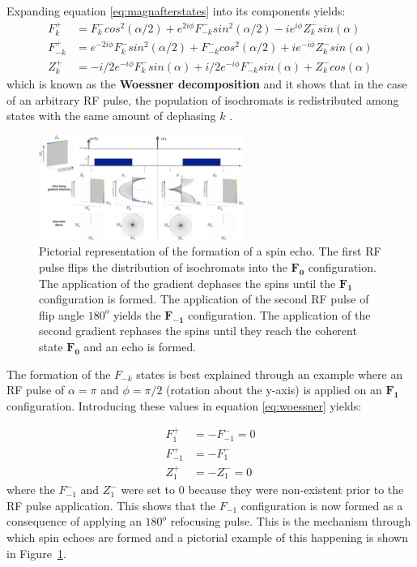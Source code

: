 \hfill 

Expanding equation \ref{eq:magnafterstates} into its components yields:
\begin{equation}\label{eq:woessner}
\begin{split}
    F_{k}^+ &= F_{k}^- cos^2(\alpha/2) + e^{2i\phi} F_{-k}^- sin^2(\alpha/2)  - i e^{i \phi} Z_{k}^- sin(\alpha)  \\
    F_{-k}^+ &=  e^{-2i\phi} F_{k}^- sin^2(\alpha/2) + F_{-k}^- cos^2(\alpha/2) + i e^{-i \phi} Z_{k}^- sin(\alpha) \\
    Z_{k}^+ &= - i/2 e^{-i \phi} F_{k}^- sin(\alpha) + i/2 e^{-i \phi} F_{-k}^- sin(\alpha) + Z_{k}^- cos(\alpha) 
\end{split}
\end{equation}
which is known as the \textbf{Woessner decomposition} and it shows that in the case of an arbitrary RF pulse, the population of isochromats is redistributed among states with the same amount of dephasing $k$ \cite{Hennig1991}.

\begin{figure}[H]
    \centering
    \includegraphics[angle=90,width=0.6\textwidth, keepaspectratio]{images/mrf/spinechoinepg}
    \caption{Pictorial representation of the formation of a spin echo.
    The first RF pulse flips the distribution of isochromats into the $\bm{F_0}$ configuration.
    The application of the gradient dephases the spins until the $\bm{F_1}$ configuration is formed.
    The application of the second RF pulse of flip angle $180^o$ yields the $\bm{F_{-1}}$ configuration.
    The application of the second gradient rephases the spins until they reach the coherent state $\bm{F_0}$ and an echo is formed.}
    \label{fig:spinechoinepg}
\end{figure}

The formation of the $F_{-k}$ states is best explained through an example where an RF pulse of $\alpha = \pi$ and $\phi = \pi/2$ (rotation about the y-axis) is applied on an $\bm{F_1}$ configuration.
Introducing these values in equation \ref{eq:woessner} yields:

\begin{equation}
\begin{split}
    F_{1}^+  &= - F_{-1}^- = 0 \\
    F_{-1}^+ &= - F_{1}^-  \\
    Z_{1}^+  &= - Z_{1}^- = 0
\end{split}
\end{equation}
where the $F_{-1}^-$ and $Z_{1}^-$ were set to $0$ because they were non-existent prior to the RF pulse application.
This shows that the $F_{-1}$ configuration is now formed as a consequence of applying an $180^o$ refocusing pulse.
This is the mechanism through which spin echoes are formed and a pictorial example of this happening is shown in Figure~\ref{fig:spinechoinepg}.

